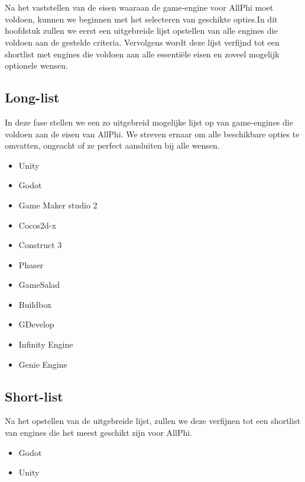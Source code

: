 
\chapter{}%
\label{ch:selectie-game-engines}

Na het vaststellen van de eisen waaraan de game-engine voor AllPhi moet voldoen, kunnen we beginnen met het selecteren van geschikte opties.In dit hoofdstuk zullen we eerst een uitgebreide lijst opstellen van alle engines die voldoen aan de gestelde criteria. Vervolgens wordt deze lijst verfijnd tot een shortlist met engines die voldoen aan alle essentiële eisen en zoveel mogelijk optionele wensen.

\section{Long-list}
In deze fase stellen we een zo uitgebreid mogelijke lijst op van game-engines die voldoen aan de eisen van AllPhi. We streven ernaar om alle beschikbare opties te omvatten, ongeacht of ze perfect aansluiten bij alle wensen.

\begin{itemize}
    \item Unity
    \item Godot
    \item Game Maker studio 2
    \item Cocos2d-x
    \item Construct 3
    \item Phaser
    \item GameSalad
    \item Buildbox
    \item GDevelop
    \item Infinity Engine
    \item Genie Engine
\end{itemize}

\section{Short-list}
Na het opstellen van de uitgebreide lijst, zullen we deze verfijnen tot een shortlist van engines die het meest geschikt zijn voor AllPhi.
\begin{itemize}
    \item Godot
    \item Unity
\end{itemize}
